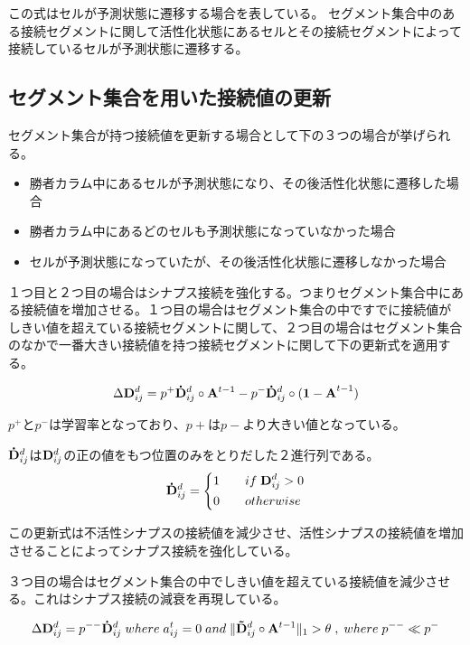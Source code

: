 この式はセルが予測状態に遷移する場合を表している。
セグメント集合中のある接続セグメントに関して活性化状態にあるセルとその接続セグメントによって接続しているセルが予測状態に遷移する。
\subsection{セグメント集合を用いた接続値の更新}
セグメント集合が持つ接続値を更新する場合として下の３つの場合が挙げられる。
\begin{itemize}
  \item 勝者カラム中にあるセルが予測状態になり、その後活性化状態に遷移した場合
  \item 勝者カラム中にあるどのセルも予測状態になっていなかった場合
  \item セルが予測状態になっていたが、その後活性化状態に遷移しなかった場合
\end{itemize}

１つ目と２つ目の場合はシナプス接続を強化する。つまりセグメント集合中にある接続値を増加させる。１つ目の場合はセグメント集合の中ですでに接続値がしきい値を超えている接続セグメントに関して、２つ目の場合はセグメント集合のなかで一番大きい接続値を持つ接続セグメントに関して下の更新式を適用する。

\begin{equation}
  \Delta {\bf D}^d_{ij} = p^+{\bf \dot{D}}^d_{ij} \circ {\bf A}^{t-1} - p^-{\bf \dot{D}}^d_{ij} \circ {\bf (1 - A}^{t-1})
\end{equation}

$p^+$と$p^-$は学習率となっており、$p+$は$p-$より大きい値となっている。

${\bf \dot{D}}^d_{ij}$は${\bf D}^d_{ij}$の正の値をもつ位置のみをとりだした２進行列である。
\begin{equation}
  {\bf \dot{D}}^d_{ij} =
  \left\{
  \begin{alignedat}{2}
    1 \qquad &if \; {\bf D}^d_{ij} > 0\\
    0 \qquad &otherwise
  \end{alignedat}
  \right.
\end{equation}

この更新式は不活性シナプスの接続値を減少させ、活性シナプスの接続値を増加させることによってシナプス接続を強化している。

３つ目の場合はセグメント集合の中でしきい値を超えている接続値を減少させる。これはシナプス接続の減衰を再現している。

\begin{equation}
  \Delta {\bf D}^d_{ij} = p^{--}{\bf \dot{D}}^d_{ij} \; where \; a^t_{ij} = 0 \; and \; \|{\bf \tilde{D}}^d_{ij} \circ {\bf A}^{t-1}\|_1 > \theta \; , \; where \; p^{--} \ll p^-
\end{equation}

